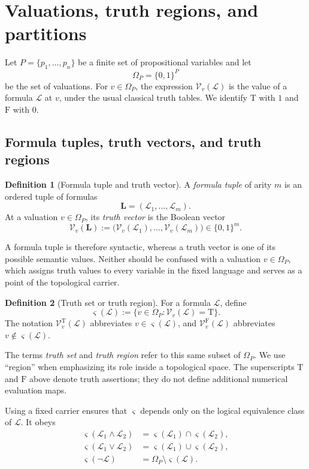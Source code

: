 \documentclass[11pt]{article}
\theoremstyle{definition}
\newtheorem{definition}{Definition}[section]
\theoremstyle{plain}
\theoremstyle{remark}
\newcommand{\True}{\mathrm{T}}
\newcommand{\False}{\mathrm{F}}
\begin{document}
\section{Valuations, truth regions, and partitions}

Let $P=\{p_1,\ldots,p_n\}$ be a finite set of propositional variables and let
\[
  \Omega_P=\{0,1\}^{P}
\]
be the set of valuations.  For $v\in\Omega_P$, the expression
$\mathcal V_v(\mathcal L)$ is the value of a formula $\mathcal L$ at $v$, under
the usual classical truth tables.  We identify $\True$ with $1$ and $\False$
with $0$.

\subsection{Formula tuples, truth vectors, and truth regions}

\begin{definition}[Formula tuple and truth vector]
A \emph{formula tuple} of arity $m$ is an ordered tuple of formulas
\[
 \mathbf L=(\mathcal L_1,\ldots,\mathcal L_m).
\]
At a valuation $v\in\Omega_P$, its \emph{truth vector} is the Boolean vector
\[
 \mathcal V_v(\mathbf L)
 :=\bigl(\mathcal V_v(\mathcal L_1),\ldots,
          \mathcal V_v(\mathcal L_m)\bigr)
 \in\{0,1\}^m.
\]
\end{definition}

A formula tuple is therefore syntactic, whereas a truth vector is one of its
possible semantic values.  Neither should be confused with a valuation
$v\in\Omega_P$, which assigns truth values to every variable in the fixed
language and serves as a point of the topological carrier.

\begin{definition}[Truth set or truth region]
For a formula $\mathcal L$, define
\[
  \varsigma(\mathcal L)
  :=\{v\in\Omega_P:\mathcal V_v(\mathcal L)=\True\}.
\]
The notation $\mathcal V_v^{\True}(\mathcal L)$ abbreviates
$v\in\varsigma(\mathcal L)$, and
$\mathcal V_v^{\False}(\mathcal L)$ abbreviates
$v\notin\varsigma(\mathcal L)$.
\end{definition}

The terms \emph{truth set} and \emph{truth region} refer to this same subset of
$\Omega_P$.  We use ``region'' when emphasizing its role inside a topological
space.  The superscripts $\True$ and $\False$ above denote truth assertions;
they do not define additional numerical evaluation maps.

Using a fixed carrier ensures that $\varsigma$ depends only on the logical
equivalence class of $\mathcal L$.  It obeys
\begin{align*}
 \varsigma(\mathcal L_1\wedge\mathcal L_2)
   &=\varsigma(\mathcal L_1)\cap\varsigma(\mathcal L_2),\\
 \varsigma(\mathcal L_1\vee\mathcal L_2)
   &=\varsigma(\mathcal L_1)\cup\varsigma(\mathcal L_2),\\
 \varsigma(\neg\mathcal L)
   &=\Omega_P\setminus\varsigma(\mathcal L).
\end{align*}
\end{document}
